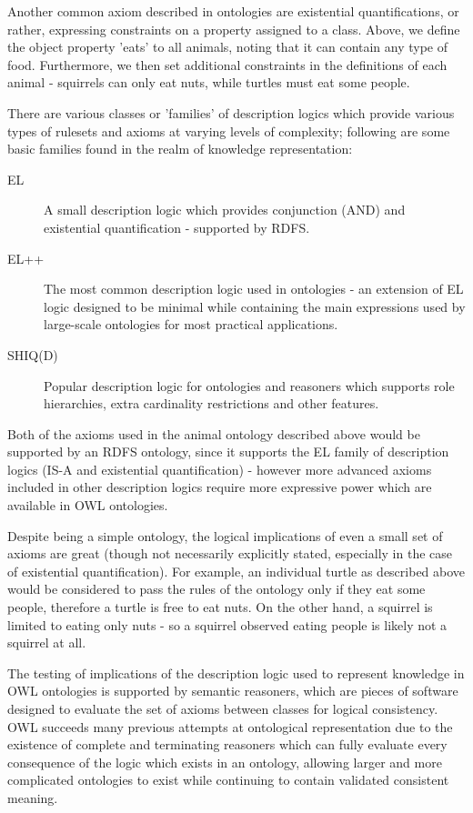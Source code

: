 \documentclass{article}
\begin{document}
Another common axiom described in ontologies are existential quantifications, or
rather, expressing constraints on a property assigned to a class. Above, we
define the object property 'eats' to all animals, noting that it can contain any
type of food. Furthermore, we then set additional constraints in the definitions
of each animal - squirrels can only eat nuts, while turtles must eat some
people.

There are various classes or 'families' of description logics which provide various 
types of rulesets and axioms at varying levels of complexity; following are some basic 
families found in the realm of knowledge representation:

\begin{description}
    \item[EL] A small description logic which provides conjunction (AND) and
    existential quantification - supported by RDFS.
    \item[EL++] The most common description logic used in ontologies - an
    extension of EL logic designed to be minimal while containing the main 
    expressions used by large-scale ontologies for most practical 
    applications.\cite{elplusplus}
    \item[SHIQ(D)] Popular description logic for ontologies and reasoners which
    supports role hierarchies, extra cardinality restrictions and other
    features. 
\end{description}

Both of the axioms used in the animal ontology described above would be
supported by an RDFS ontology, since it supports the EL family of description
logics (IS-A and existential quantification) - however more advanced axioms
included in other description logics require more expressive power which are
available in OWL ontologies.

Despite being a simple ontology, the logical implications of even a small set of
axioms are great (though not necessarily explicitly stated, especially in the
case of existential quantification). For example, an individual turtle as described 
above would be considered to pass the rules of the ontology only if they eat some 
people, therefore a turtle is free to eat nuts. On the other hand, a squirrel is limited
to eating only nuts - so a squirrel observed eating people is likely not a
squirrel at all.

The testing of implications of the description logic used to represent
knowledge in OWL ontologies is supported by semantic reasoners, which are 
pieces of software designed to evaluate the set of axioms between classes for 
logical consistency. OWL succeeds many previous attempts at ontological 
representation due to the existence of complete and terminating reasoners 
which can fully evaluate every consequence of the logic which exists in an 
ontology, allowing larger and more complicated ontologies to exist while 
continuing to contain validated consistent meaning.
\end{document}
